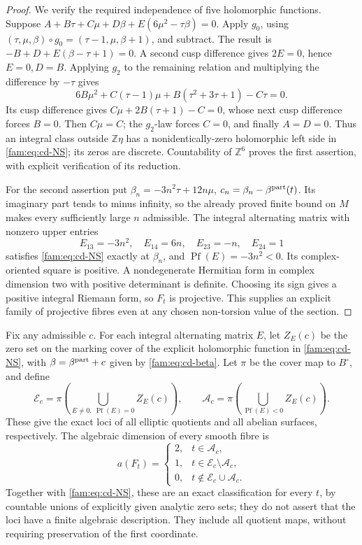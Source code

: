 \begin{proof}
We verify the required independence of five holomorphic functions.
Suppose \(A+B\tau+C\mu+D\beta+E(6\mu^2-\tau\beta)=0\).
Apply \(g_0\), using \((\tau,\mu,\beta)\circ g_0=(\tau-1,\mu,\beta+1)\),
and subtract. The result is \(-B+D+E(\beta-\tau+1)=0\).
A second cusp difference gives \(2E=0\), hence \(E=0,D=B\).
Applying \(g_2\) to the remaining relation and multiplying the difference
by \(-\tau\) gives
\[
 6B\mu^2+C(\tau-1)\mu+B(\tau^2+3\tau+1)-C\tau=0.
\]
Its cusp difference gives \(C\mu+2B(\tau+1)-C=0\), whose next cusp
difference forces \(B=0\). Then \(C\mu=C\); the \(g_2\)-law forces
\(C=0\), and finally \(A=D=0\). Thus an integral class outside
\(\mathbb Z\eta\) has a nonidentically-zero holomorphic left side in
\eqref{fam:eq:cd-NS}; its zeros are discrete. Countability of \(\mathbb Z^6\)
proves the first assertion, with explicit verification of its reduction.

For the second assertion put
\(\beta_n=-3n^2\tau+12n\mu\),
\(c_n=\beta_n-\beta^{\rm part}(t)\). Its imaginary part tends to
minus infinity, so the already proved finite bound on \(M\) makes every
sufficiently large \(n\) admissible. The integral alternating matrix
with nonzero upper entries
\[
 E_{13}=-3n^2,\quad E_{14}=6n,\quad E_{23}=-n,\quad E_{24}=1
\]
satisfies \eqref{fam:eq:cd-NS} exactly at \(\beta_n\), and
\(\operatorname{Pf}(E)=-3n^2<0\). Its complex-oriented square is positive.
A nondegenerate Hermitian form in complex dimension two with positive
determinant is definite. Choosing its sign gives a positive integral
Riemann form, so \(F_t\) is projective. This supplies an explicit family
of projective fibres even at any chosen non-torsion value of the section.
\end{proof}

\begin{theorem}\label{fam:src:D.1.6}\label{fam:st:D.1.6}
Fix any admissible $c$. For each integral alternating matrix $E$, let
$Z_E(c)$ be the zero set on the marking cover of the explicit holomorphic
function in \eqref{fam:eq:cd-NS}, with $\beta=\beta^{\rm part}+c$ given by
\eqref{fam:eq:cd-beta}. Let $\pi$ be the cover map to $B^\circ$, and define
\[
 \mathcal E_c=\pi\!\left(\bigcup_{E\ne0,\ \operatorname{Pf}(E)=0}Z_E(c)\right),
 \qquad
 \mathcal A_c=\pi\!\left(\bigcup_{\operatorname{Pf}(E)<0}Z_E(c)\right).
\]
These give the exact loci of all elliptic quotients and all abelian
surfaces, respectively. The algebraic dimension of every smooth fibre is
\[
 a(F_t)=
 \begin{cases}
 2,&t\in\mathcal A_c,\\
 1,&t\in\mathcal E_c\setminus\mathcal A_c,\\
 0,&t\notin\mathcal E_c\cup\mathcal A_c.
 \end{cases}
\]
Together with \eqref{fam:eq:cd-NS}, these are an exact classification for every
$t$, by countable unions of explicitly given analytic zero sets; they do
not assert that the loci have a finite algebraic description. They include
all quotient maps, without requiring preservation of the first coordinate.
\end{theorem}


